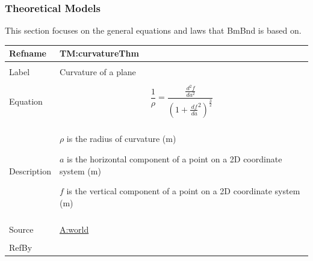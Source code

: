 \documentclass[12pt]{article}
\begin{document}
\subsubsection{Theoretical Models}
\label{Sec:TMs}
This section focuses on the general equations and laws that BmBnd is based on.

\vspace{\baselineskip}
\noindent
\begin{minipage}{\textwidth}
\begin{tabular}{>{\raggedright}p{}>{\raggedright\arraybackslash}p{}}
\toprule \textbf{Refname} & \textbf{TM:curvatureThm}
\label{TM:curvatureThm}
\\ \midrule \\
Label & Curvature of a plane
        
\\ \midrule \\
Equation & \begin{displaymath}
           \frac{1}{ρ}=\frac{\frac{\,d^{2}f}{\,da^{2}}}{\left(1+\frac{\,df}{\,da}^{2}\right)^{\frac{3}{2}}}
           \end{displaymath}
\\ \midrule \\
Description & \begin{symbDescription}
              \item{$ρ$ is the radius of curvature (${\text{m}}$)}
              \item{$a$ is the horizontal component of a point on a 2D coordinate system (${\text{m}}$)}
              \item{$f$ is the vertical component of a point on a 2D coordinate system (${\text{m}}$)}
              \end{symbDescription}
\\ \midrule \\
Source & \hyperref[world]{A:world}
         
\\ \midrule \\
RefBy & 
\\ \bottomrule
\end{tabular}
\end{minipage}
\vspace{\baselineskip}
\noindent
\end{document}
